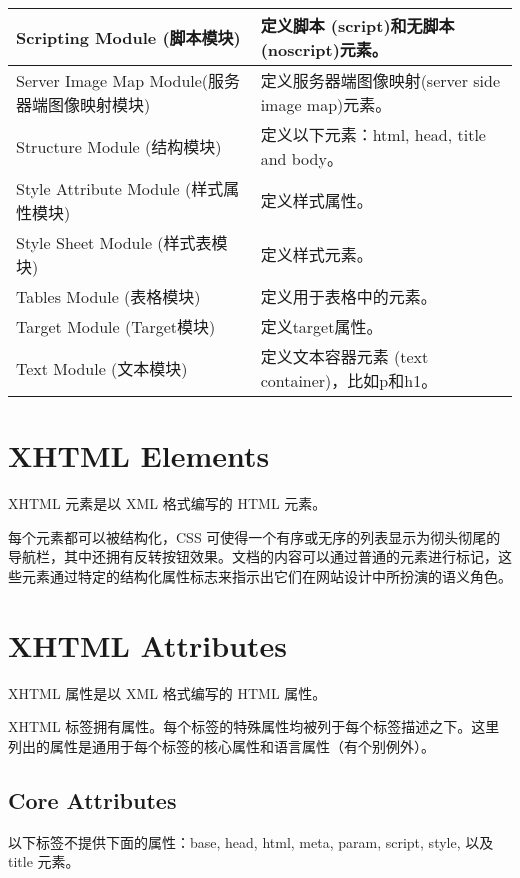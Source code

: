 \begin{longtable}{|p{190pt}|p{190pt}|}
\hline
Scripting Module (脚本模块)			&定义脚本 (script)和无脚本 (noscript)元素。\\
\hline
Server Image Map Module(服务器端图像映射模块)	&定义服务器端图像映射(server side image map)元素。\\
\hline
Structure Module (结构模块)			&定义以下元素：html, head, title and body。\\
\hline
Style Attribute Module (样式属性模块)&定义样式属性。\\
\hline
Style Sheet Module (样式表模块)		&定义样式元素。\\
\hline
Tables Module (表格模块)			&定义用于表格中的元素。\\
\hline
Target Module (Target模块)			&定义target属性。\\
\hline
Text Module (文本模块)				&定义文本容器元素 (text container)，比如p和h1。\\
\hline



\end{longtable}





\chapter{XHTML Elements}

XHTML 元素是以 XML 格式编写的 HTML 元素。

每个元素都可以被结构化，CSS 可使得一个有序或无序的列表显示为彻头彻尾的导航栏，其中还拥有反转按钮效果。文档的内容可以通过普通的元素进行标记，这些元素通过特定的结构化属性标志来指示出它们在网站设计中所扮演的语义角色。






\chapter{XHTML Attributes}

XHTML 属性是以 XML 格式编写的 HTML 属性。

XHTML 标签拥有属性。每个标签的特殊属性均被列于每个标签描述之下。这里列出的属性是通用于每个标签的核心属性和语言属性（有个别例外）。


\section{Core Attributes}

以下标签不提供下面的属性：base, head, html, meta, param, script, style, 以及 title 元素。

